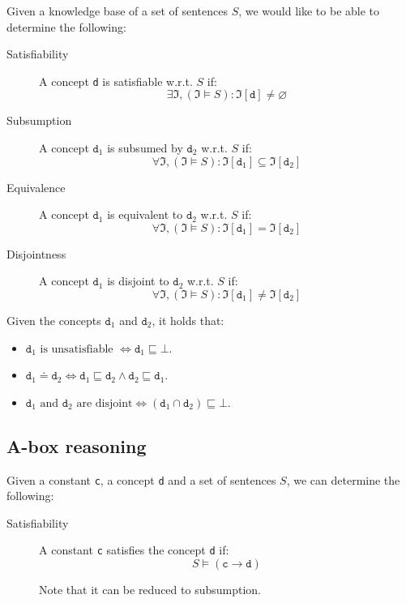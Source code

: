 Given a knowledge base of a set of sentences $S$, we would like to be able to determine the following:
\begin{description}
    \item[Satisfiability] 
        A concept \texttt{d} is satisfiable w.r.t. $S$ if:
        \[ \exists \mathfrak{I}, (\mathfrak{I} \models S): \mathfrak{I}[\texttt{d}] \neq \varnothing \]

    \item[Subsumption] 
        A concept $\texttt{d}_1$ is subsumed by $\texttt{d}_2$ w.r.t. $S$ if:
        \[ \forall \mathfrak{I}, (\mathfrak{I} \models S): \mathfrak{I}[\texttt{d}_1] \subseteq \mathfrak{I}[\texttt{d}_2] \]

    \item[Equivalence] 
        A concept $\texttt{d}_1$ is equivalent to $\texttt{d}_2$ w.r.t. $S$ if:
        \[ \forall \mathfrak{I}, (\mathfrak{I} \models S): \mathfrak{I}[\texttt{d}_1] = \mathfrak{I}[\texttt{d}_2] \]

    \item[Disjointness] 
        A concept $\texttt{d}_1$ is disjoint to $\texttt{d}_2$ w.r.t. $S$ if:
        \[ \forall \mathfrak{I}, (\mathfrak{I} \models S): \mathfrak{I}[\texttt{d}_1] \neq \mathfrak{I}[\texttt{d}_2] \]
\end{description}

\begin{theorem}
    Given the concepts $\texttt{d}_1$ and $\texttt{d}_2$, it holds that:
    \begin{itemize}
        \item $\texttt{d}_1 \text{ is unsatisfiable } \iff \texttt{d}_1 \sqsubseteq \bot$.
        \item $\texttt{d}_1 \doteq \texttt{d}_2 \iff \texttt{d}_1 \sqsubseteq \texttt{d}_2 \land \texttt{d}_2 \sqsubseteq \texttt{d}_1$.
        \item $\texttt{d}_1 \text{ and } \texttt{d}_2 \text{ are disjoint} \iff (\texttt{d}_1 \cap \texttt{d}_2) \sqsubseteq \bot$.
    \end{itemize}
\end{theorem}

\subsection{A-box reasoning}
Given a constant \texttt{c}, a concept \texttt{d} and a set of sentences $S$, we can determine the following:
\begin{description}
    \item[Satisfiability] 
        A constant \texttt{c} satisfies the concept \texttt{d} if:
        \[ S \models (\texttt{c} \rightarrow \texttt{d}) \]

        Note that it can be reduced to subsumption.
\end{description}


